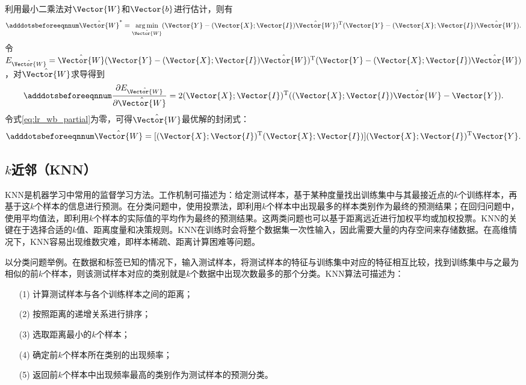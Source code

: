 利用最小二乘法对$\Vector{W}$和$\Vector{b}$进行估计，则有
\begin{equation}\adddotsbeforeeqnnum
  \label{eq:lr_wb}
  \hat{\Vector{W}}^*=\mathop{\arg\min}\limits_{\hat{\Vector{W}}}(\Vector{Y}-(\Vector{X};\Vector{I})\hat{\Vector{W}})^{\text{T}}(\Vector{Y}-(\Vector{X};\Vector{I})\hat{\Vector{W}}).
\end{equation}
令$E_{\hat{\Vector{W}}}={\hat{\Vector{W}}}(\Vector{Y}-(\Vector{X};\Vector{I})\hat{\Vector{W}})^{\text{T}}(\Vector{Y}-(\Vector{X};\Vector{I})\hat{\Vector{W}})$，对$\hat{\Vector{W}}$求导得到
\begin{equation}\adddotsbeforeeqnnum
  \label{eq:lr_wb_partial}
  \frac{\partial{E_{\hat{\Vector{W}}}}}{\partial{\hat{\Vector{W}}}}=2(\Vector{X};\Vector{I})^{\text{T}}((\Vector{X};\Vector{I})\hat{\Vector{W}}-\Vector{Y}).
\end{equation}
令式\ref{eq:lr_wb_partial}为零，可得$\hat{\Vector{W}}$最优解的封闭式：
\begin{equation}\adddotsbeforeeqnnum
  \label{eq:lr_wb_feng}
  \hat{\Vector{W}}=[(\Vector{X};\Vector{I})^{\text{T}}(\Vector{X};\Vector{I})](\Vector{X};\Vector{I})^{\text{T}}\Vector{Y}.
\end{equation}

\subsection{$k$近邻（KNN）}\label{sec:ml_knn}

KNN是机器学习中常用的监督学习方法。工作机制可描述为：给定测试样本，基于某种度量找出训练集中与其最接近点的$k$个训练样本，再基于这$k$个样本的信息进行预测。在分类问题中，使用投票法，即利用$k$个样本中出现最多的样本类别作为最终的预测结果；在回归问题中，使用平均值法，即利用$k$个样本的实际值的平均作为最终的预测结果。这两类问题也可以基于距离远近进行加权平均或加权投票。KNN的关键在于选择合适的$k$值、距离度量和决策规则。KNN在训练时会将整个数据集一次性输入，因此需要大量的内存空间来存储数据。在高维情况下，KNN容易出现维数灾难，即样本稀疏、距离计算困难等问题。

以分类问题举例。在数据和标签已知的情况下，输入测试样本，将测试样本的特征与训练集中对应的特征相互比较，找到训练集中与之最为相似的前$k$个样本，则该测试样本对应的类别就是$k$个数据中出现次数最多的那个分类。KNN算法可描述为：
\begin{enumerate}
  \item[(1)] 计算测试样本与各个训练样本之间的距离；
  \item[(2)] 按照距离的递增关系进行排序；
  \item[(3)] 选取距离最小的$k$个样本；
  \item[(4)] 确定前$k$个样本所在类别的出现频率；
  \item[(5)] 返回前$k$个样本中出现频率最高的类别作为测试样本的预测分类。
\end{enumerate}

